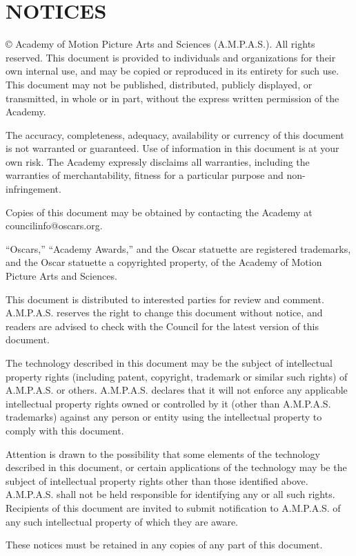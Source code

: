 \prelimsectionformat	%
\chapter{\uppercase{Notices}}

\copyright\the\year{} Academy of Motion Picture Arts and Sciences (A.M.P.A.S.). All rights reserved. This document is provided to individuals and organizations for their own internal use, and may be copied or reproduced in its entirety for such use. This document may not be published, distributed, publicly displayed, or transmitted, in whole or in part, without the express written permission of the Academy.

The accuracy, completeness, adequacy, availability or currency of this document is not warranted or guaranteed. Use of information in this document is at your own risk. The Academy expressly disclaims all warranties, including the warranties of merchantability, fitness for a particular purpose and non-infringement.

Copies of this document may be obtained by contacting the Academy at councilinfo@oscars.org.

``Oscars,'' ``Academy Awards,'' and the Oscar statuette are registered trademarks, and the Oscar statuette a copyrighted property, of the Academy of Motion Picture Arts and Sciences.

This document is distributed to interested parties for review and comment. A.M.P.A.S. reserves the right to change this document without notice, and readers are advised to check with the Council for the latest version of this document.

The technology described in this document may be the subject of intellectual property rights (including patent, copyright, trademark or similar such rights) of A.M.P.A.S. or others. A.M.P.A.S. declares that it will not enforce any applicable intellectual property rights owned or controlled by it (other than A.M.P.A.S. trademarks) against any person or entity using the intellectual property to comply with this document.

Attention is drawn to the possibility that some elements of the technology described in this document, or certain applications of the technology may be the subject of intellectual property rights other than those identified above. A.M.P.A.S. shall not be held responsible for identifying any or all such rights. Recipients of this document are invited to submit notification to A.M.P.A.S. of any such intellectual property of which they are aware.

\vspace{10pt}
These notices must be retained in any copies of any part of this document.